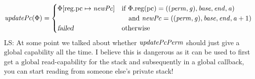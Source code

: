 \documentclass[a4paper]{article}
\newcommand{\update}[2]{[#1 \mapsto #2]}
\newcommand\lau[1]{{\color{purple} \sf \footnotesize {LS: #1}}\\}
\newcommand{\var}[1]{\mathit{#1}}
\newcommand{\gl}{\var{g}}
\newcommand{\pcreg}{\mathrm{pc}}
\newcommand{\addr}{\var{a}}
\newcommand{\start}{\var{base}}
\newcommand{\addrend}{\var{end}}
\newcommand{\perm}{\var{perm}}
\newcommand{\stdcap}[1][(\perm,\gl)]{\left(#1,\start,\addrend,\addr \right)}
\newcommand{\plainproj}[1]{\mathrm{#1}}
\newcommand{\memreg}[1][\Phi]{#1.\plainproj{reg}}
\newcommand{\updateReg}[3][\Phi]{#1\update{\plainproj{reg}.#2}{#3}}
\newcommand{\failed}{\textsl{failed}}
\newcommand{\plainfun}[2]{
  \ifthenelse{\equal{#2}{}}
  {\mathit{#1}}
  {\mathit{#1}(#2)}
}
\newcommand{\updatePcPerm}[1]{\plainfun{updatePcPerm}{#1}}
\newcommand{\stdUpdatePc}[1]{\plainfun{updatePc}{#1}}
\newcommand{\plainperm}[1]{\mathrm{#1}}
\newcommand{\glob}{\plainperm{global}}
\begin{document}
\begin{align*}
  \stdUpdatePc{\Phi} &=
                       \begin{cases}
                         \updateReg{\pcreg}{\var{newPc}} & 
                         \arraycolsep=0pt
                         \begin{array}[t]{l}
                           \text{if $\memreg(\pcreg) = \stdcap$}\\
                           \quad\text{and $\var{newPc} = ((\perm,\gl),\start,\addrend,\addr + 1)$}\\
                         \end{array} \\
                         \failed & \text{otherwise}
                       \end{cases} \\
\end{align*}
\lau{At some point we talked about whether $\updatePcPerm{}$ should just give a $\glob$ capability all the time. I believe this is dangerous as it can be used to first get a $\glob$ read-capability for the stack and subsequently in a $\glob$ callback, you can start reading from someone else's private stack!}
\end{document}
